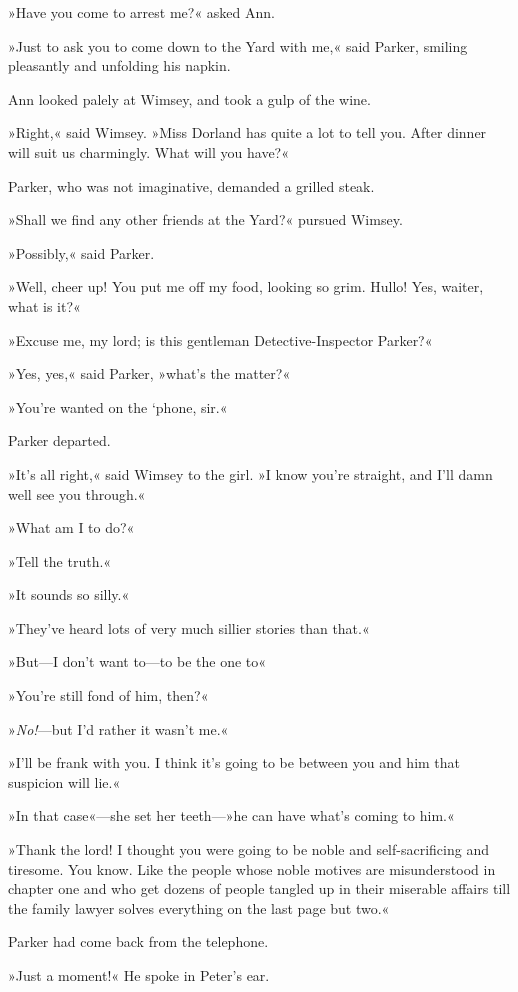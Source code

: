 »Have you come to arrest me?« asked Ann.

»Just to ask you to come down to the Yard with me,« said Parker, smiling pleasantly and unfolding his napkin.

Ann looked palely at Wimsey, and took a gulp of the wine.

»Right,« said Wimsey. »Miss Dorland has quite a lot to tell you. After dinner will suit us charmingly. What will you have?«

Parker, who was not imaginative, demanded a grilled steak.

»Shall we find any other friends at the Yard?« pursued Wimsey.

»Possibly,« said Parker.

»Well, cheer up! You put me off my food, looking so grim. Hullo! Yes, waiter, what is it?«

»Excuse me, my lord; is this gentleman Detective-Inspector Parker?«

»Yes, yes,« said Parker, »what's the matter?«

»You're wanted on the `phone, sir.«

Parker departed.

»It's all right,« said Wimsey to the girl. »I know you're straight, and I'll damn well see you through.«

»What am I to do?«

»Tell the truth.«

»It sounds so silly.«

»They've heard lots of very much sillier stories than that.«

»But—I don't want to—to be the one to\longdash«

»You're still fond of him, then?«

»\textit{No!}—but I'd rather it wasn't me.«

»I'll be frank with you. I think it's going to be between you and him that suspicion will lie.«

»In that case«—she set her teeth—»he can have what's coming to him.«

»Thank the lord! I thought you were going to be noble and self-sacrificing and tiresome. You know. Like the people whose noble motives are misunderstood in chapter one and who get dozens of people tangled up in their miserable affairs till the family lawyer solves everything on the last page but two.«

Parker had come back from the telephone.

»Just a moment!« He spoke in Peter's ear.

